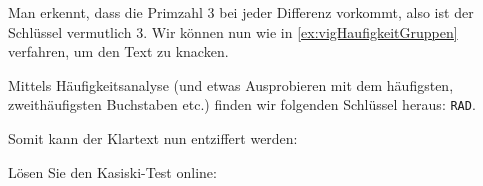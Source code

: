 \begin{myexercise}
\begin{myanswer}
Man erkennt, dass die Primzahl 3 bei jeder Differenz vorkommt, also ist der Schlüssel vermutlich 3. Wir können nun wie in \cref{ex:vigHaufigkeitGruppen} verfahren, um den Text zu knacken.

Mittels Häufigkeitsanalyse (und etwas Ausprobieren mit dem häufigsten, zweithäufigsten Buchstaben etc.) finden wir folgenden Schlüssel heraus: \texttt{RAD}. 

Somit kann der Klartext nun entziffert werden:

\end{myanswer}

\end{myexercise}

\begin{mychallenge}
Lösen Sie den Kasiski-Test online: 
\end{mychallenge}
